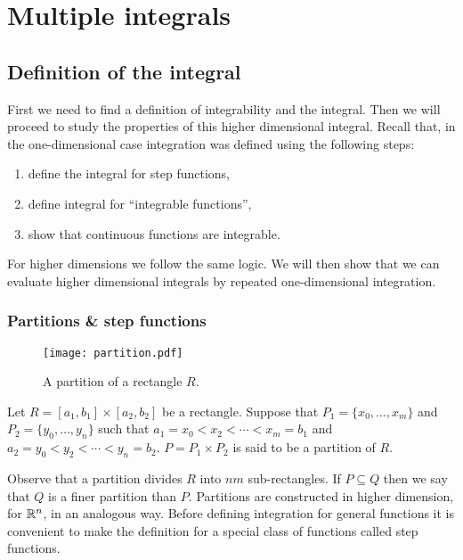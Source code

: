 \chapter{Multiple integrals}


\section{Definition of the integral}

First we need to find a definition of integrability and the integral.
Then we will proceed to study the properties of this higher dimensional integral.
Recall that, in the one-dimensional case integration was defined using the following steps:
\begin{enumerate}
    \item define the integral for step functions,
    \item define integral for ``integrable functions'',
    \item show that continuous functions are integrable.
\end{enumerate}
For higher dimensions we follow the same logic.
We will then show that we can evaluate higher dimensional integrals by repeated one-dimensional integration.

\subsection{Partitions \& step functions}

\begin{figure}
    \centering
    \texttt{[image: partition.pdf]}
    \caption{A partition of a rectangle \(R\).}
\end{figure}

\begin{definition*}[partition]
    Let \(R = [a_1,b_1] \times [a_2,b_2]\) be a rectangle.
    Suppose that \(P_1 = \{x_0,\ldots,x_m\}\) and \(P_2 = \{y_0,\ldots,y_n\}\) such that
    \(a_1 = x_0 < x_2 < \cdots < x_m = b_1\) and \(a_2 = y_0 < y_2 < \cdots < y_n = b_2\).
    \(P= P_1 \times P_2\) is said to be a partition of \(R\).
\end{definition*}

Observe that a partition divides \(R\) into \(nm\) sub-rectangles.
If \(P \subseteq Q\) then we say that \(Q\) is a finer partition than \(P\).
Partitions are constructed in higher dimension, for \(\mathbb{R}^n\), in an analogous way.
Before defining integration for general functions it is convenient to make the definition for a special class of functions called step functions.


